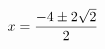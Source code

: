 \documentclass[preview]{standalone}
\begin{document}
\begin{align*}
\special{dvisvgm:raw <g id='unique000'>}x=\frac{-4\pm 2 \sqrt{2}}{2}\special{dvisvgm:raw </g>}
\end{align*}
\end{document}
